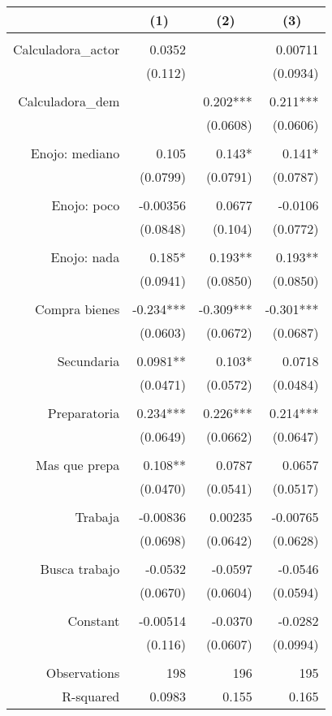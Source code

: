 \begin{tabular}{rrrr}
\toprule
      & \multicolumn{1}{c}{(1)} & \multicolumn{1}{c}{(2)} & \multicolumn{1}{c}{(3)} \\
\midrule
      &       &       &  \\
Calculadora\_actor & 0.0352 &       & 0.00711 \\
      & (0.112) &       & (0.0934) \\
      &       &       &  \\
Calculadora\_dem  &       & 0.202*** & 0.211*** \\
      &       & (0.0608) & (0.0606) \\
      &       &       &  \\
Enojo: mediano & 0.105 & 0.143* & 0.141* \\
      & (0.0799) & (0.0791) & (0.0787) \\
      &       &       &  \\
Enojo: poco & -0.00356 & 0.0677 & -0.0106 \\
      & (0.0848) & (0.104) & (0.0772) \\
      &       &       &  \\
Enojo: nada & 0.185* & 0.193** & 0.193** \\
      & (0.0941) & (0.0850) & (0.0850) \\
      &       &       &  \\
Compra bienes & -0.234*** & -0.309*** & -0.301*** \\
      & (0.0603) & (0.0672) & (0.0687) \\
      &       &       &  \\
Secundaria & 0.0981** & 0.103* & 0.0718 \\
      & (0.0471) & (0.0572) & (0.0484) \\
      &       &       &  \\
Preparatoria & 0.234*** & 0.226*** & 0.214*** \\
      & (0.0649) & (0.0662) & (0.0647) \\
      &       &       &  \\
Mas que prepa & 0.108** & 0.0787 & 0.0657 \\
      & (0.0470) & (0.0541) & (0.0517) \\
      &       &       &  \\
Trabaja & -0.00836 & 0.00235 & -0.00765 \\
      & (0.0698) & (0.0642) & (0.0628) \\
      &       &       &  \\
Busca trabajo & -0.0532 & -0.0597 & -0.0546 \\
      & (0.0670) & (0.0604) & (0.0594) \\
      &       &       &  \\
Constant  & -0.00514 & -0.0370 & -0.0282 \\
      & (0.116) & (0.0607) & (0.0994) \\
      &       &       &  \\
Observations & 198   & 196   & 195 \\
R-squared & 0.0983 & 0.155 & 0.165 \\
\bottomrule
\end{tabular}%
